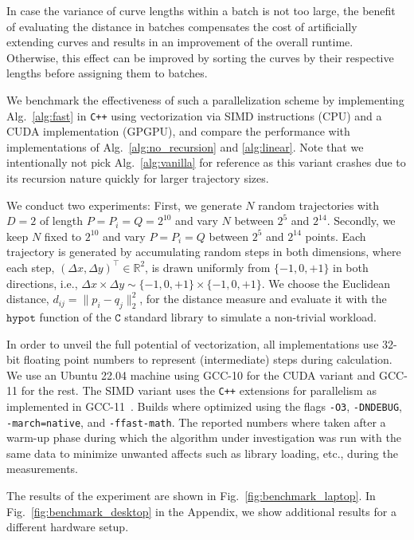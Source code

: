 In case the variance of curve lengths within a batch is not too large, the benefit of evaluating the distance in batches compensates the cost of artificially extending curves and results in an improvement of the overall runtime.
Otherwise, this effect can be improved by sorting the curves by their respective lengths before assigning them to batches.

We benchmark the effectiveness of such a parallelization scheme by implementing Alg.~\ref{alg:fast} in \texttt{C++} using vectorization via SIMD instructions (CPU) and a CUDA implementation (GPGPU), and compare the performance with implementations of Alg.~\ref{alg:no_recursion} and \ref{alg:linear}.
Note that we intentionally not pick Alg.~\ref{alg:vanilla} for reference as this variant crashes due to its recursion nature quickly for larger trajectory sizes.

We conduct two experiments:
First, we generate $N$ random trajectories with $D=2$ of length $P = P_i = Q = 2^{10}$ and vary $N$ between $2^5$ and $2^{14}$.
Secondly, we keep $N$ fixed to $2^{10}$ and vary $P = P_i = Q$ between $2^5$ and $2^{14}$ points.
Each trajectory is generated by accumulating random steps in both dimensions, where each step, $(\Delta x, \Delta y)^\top \in \mathbb{R}^2$, is drawn uniformly from $\{-1, 0, +1\}$ in both directions, i.e., $\Delta x \times \Delta y \sim \{ -1, 0, +1 \} \times \{ -1, 0, +1 \}$.
We choose the Euclidean distance, $d_{ij} = \| p_i - q_j \|^2_2$, for the distance measure and evaluate it with the $\texttt{hypot}$ function of the $\texttt{C}$ standard library to simulate a non-trivial workload.

In order to unveil the full potential of vectorization, all implementations use 32-bit floating point numbers to represent (intermediate) steps during calculation.
We use an Ubuntu 22.04 machine using GCC-10 for the CUDA variant and GCC-11 for the rest.
The SIMD variant uses the \texttt{C++} extensions for parallelism as implemented in GCC-11~\citep{N4808}.
Builds where optimized using the flags \texttt{-O3}, \texttt{-DNDEBUG}, \texttt{-march=native}, and \texttt{-ffast-math}.
The reported numbers where taken after a warm-up phase during which the algorithm under investigation was run with the same data to minimize unwanted affects such as library loading, etc., during the measurements.

The results of the experiment are shown in Fig.~\ref{fig:benchmark_laptop}.
In Fig.~\ref{fig:benchmark_desktop} in the Appendix, we show additional results for a different hardware setup.

